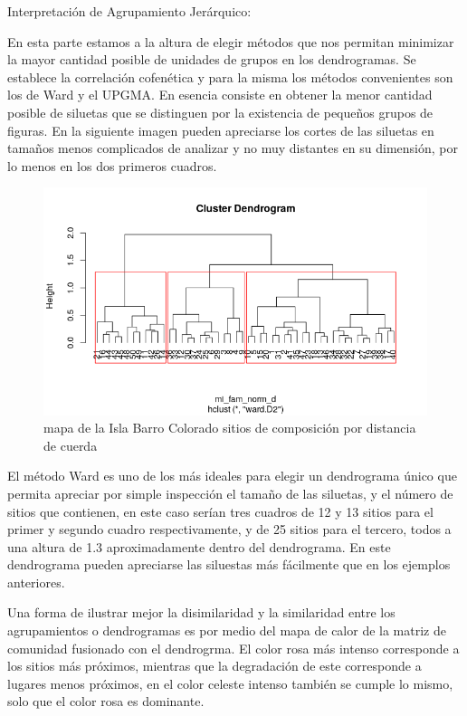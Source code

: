 \documentclass[11pt,]{article}
\begin{document}
Interpretación de Agrupamiento Jerárquico:

En esta parte estamos a la altura de elegir métodos que nos permitan
minimizar la mayor cantidad posible de unidades de grupos en los
dendrogramas. Se establece la correlación cofenética y para la misma los
métodos convenientes son los de Ward y el UPGMA. En esencia consiste en
obtener la menor cantidad posible de siluetas que se distinguen por la
existencia de pequeños grupos de figuras. En la siguiente imagen pueden
apreciarse los cortes de las siluetas en tamaños menos complicados de
analizar y no muy distantes en su dimensión, por lo menos en los dos
primeros cuadros.

\begin{figure}
\centering
\includegraphics[width=1.00000\textwidth]{agrupamiento_dendrograma.png}
\caption{mapa de la Isla Barro Colorado sitios de composición por
distancia de cuerda \label{fig:bci_map}}
\end{figure}

El método Ward es uno de los más ideales para elegir un dendrograma
único que permita apreciar por simple inspección el tamaño de las
siluetas, y el número de sitios que contienen, en este caso serían tres
cuadros de 12 y 13 sitios para el primer y segundo cuadro
respectivamente, y de 25 sitios para el tercero, todos a una altura de
1.3 aproximadamente dentro del dendrograma. En este dendrograma pueden
apreciarse las siluestas más fácilmente que en los ejemplos anteriores.

Una forma de ilustrar mejor la disimilaridad y la similaridad entre los
agrupamientos o dendrogramas es por medio del mapa de calor de la matriz
de comunidad fusionado con el dendrogrma. El color rosa más intenso
corresponde a los sitios más próximos, mientras que la degradación de
este corresponde a lugares menos próximos, en el color celeste intenso
también se cumple lo mismo, solo que el color rosa es dominante.
\end{document}
